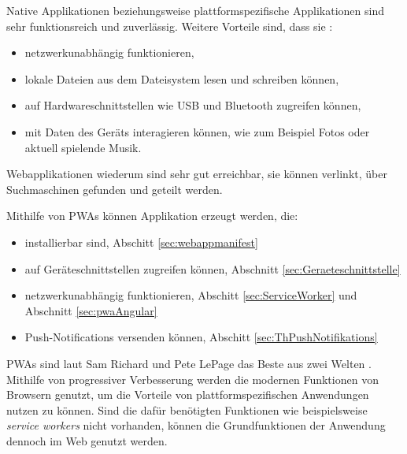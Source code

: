 Native Applikationen beziehungsweise plattformspezifische Applikationen sind sehr funktionsreich und zuverlässig. Weitere Vorteile sind, dass sie : 
\begin{itemize}
    \item  netzwerkunabhängig funktionieren,
    \item  lokale Dateien aus dem Dateisystem lesen und schreiben können, 
    \item  auf Hardwareschnittstellen wie USB und Bluetooth zugreifen können, 
    \item  mit Daten des Geräts interagieren können, wie zum Beispiel Fotos oder aktuell spielende Musik. 
\end{itemize}

Webapplikationen wiederum sind sehr gut erreichbar, sie können verlinkt, über Suchmaschinen gefunden und geteilt werden. 

Mithilfe von PWAs können Applikation erzeugt werden, die: 
\begin{itemize}
    \item installierbar sind, Abschitt \ref{sec:webappmanifest} 
    \item auf Geräteschnittstellen zugreifen können, Abschnitt \ref{sec:Geraeteschnittstelle} 
    \item netzwerkunabhängig funktionieren, Abschitt \ref{sec:ServiceWorker} und Abschnitt \ref{sec:pwaAngular}
    \item Push-Notifications versenden können, Abschitt \ref{sec:ThPushNotifikations}
\end{itemize}

PWAs sind laut Sam Richard und Pete LePage das Beste aus zwei Welten \cite{SamRichard2020}. Mithilfe von progressiver Verbesserung werden die modernen Funktionen von Browsern genutzt, um die Vorteile von plattformspezifischen Anwendungen nutzen zu können. Sind die dafür benötigten Funktionen wie beispielsweise \textit{service workers} nicht vorhanden, können die Grundfunktionen der Anwendung dennoch im Web genutzt werden. 

